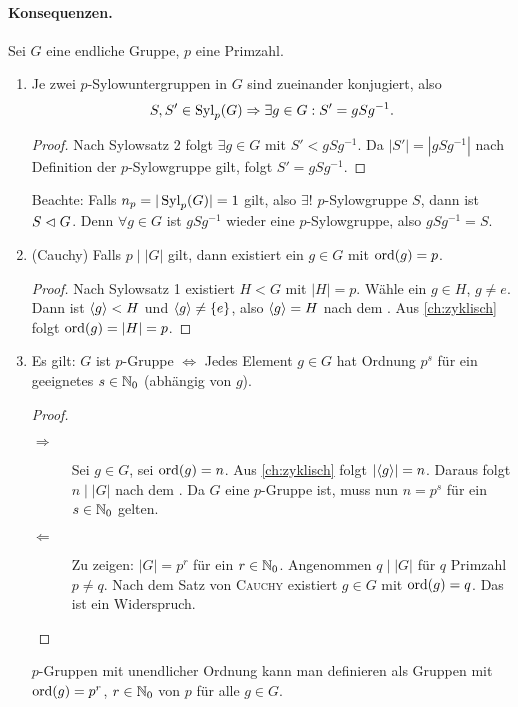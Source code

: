 \documentclass[12pt,a4paper]{scrartcl}
\begin{document}
\paragraph{Konsequenzen.}
Sei $G$ eine endliche Gruppe, $p$ eine Primzahl.
\begin{enumerate}
	\item Je zwei $p$-Sylowuntergruppen in $G$ sind zueinander konjugiert, also \[S, S'\in \operatorname{Syl}_p(G) \Rightarrow \exists g\in G: S' = gSg^{-1}.\] \label{kons:kong}
	\begin{proof}
		Nach Sylowsatz 2 folgt $\exists g\in G$ mit $S'<gSg^{-1}$. Da $|S'| = |gSg^{-1}|$ nach Definition der $p$-Sylowgruppe gilt, folgt $S' = gSg^{-1}$.
	\end{proof}
	
	Beachte: Falls $n_p  = |\operatorname{Syl}_p(G)| = 1$ gilt, also $\exists!$ $p$-Sylowgruppe $S$, dann ist $S\vartriangleleft G$. Denn $\forall g\in G$ ist $gSg^{-1}$ wieder eine $p$-Sylowgruppe, also $gSg^{-1} = S$.
	
	\item (Cauchy) Falls $p\mid|G|$ gilt, dann existiert ein $g\in G$ mit $\operatorname{ord}(g) = p$.
	\begin{proof}
		Nach Sylowsatz 1 existiert $H<G$ mit $|H| = p$. Wähle ein $g\in H$, $g\neq e$. Dann ist $\langle g\rangle <H$ und $\langle g\rangle \neq \{e\}$, also $\langle g\rangle = H$ nach dem . Aus \cref{ch:zyklisch} folgt $\operatorname{ord}(g) = |H| = p$.
	\end{proof}
	\item Es gilt: $G$ ist $p$-Gruppe $\Leftrightarrow $ Jedes Element $g\in G$ hat Ordnung $p^s$ für ein geeignetes $s\in \mathbb N_0$ (abhängig von $g$).
	\begin{proof}~
		\begin{description} %
			\item[\glqq$\Rightarrow$\grqq] Sei $g\in G$, sei $\operatorname{ord}(g) = n$. Aus \cref{ch:zyklisch} folgt $|\langle g\rangle| = n$. Daraus folgt $n\mid |G|$ nach dem . Da $G$ eine $p$-Gruppe ist, muss nun $n = p^s$ für ein $s \in \mathbb N_0$ gelten.
			\item[\grqq $\Leftarrow$\grqq] Zu zeigen: $|G| = p^r$ für ein $r\in\mathbb N_0$.
			Angenommen $q\mid|G|$ für $q$ Primzahl $p\neq q$. Nach dem Satz von \textsc{Cauchy} existiert $g\in G$ mit $\operatorname{ord}(g) = q$. Das ist ein Widerspruch.
    \qedhere
		\end{description}
	\end{proof}
	\begin{bem}
		$p$-Gruppen mit unendlicher Ordnung kann man definieren als Gruppen mit $\operatorname{ord}(g) = p^r$, $r\in \mathbb N_0$ von $p$ für alle $g\in G$.
	\end{bem}
\end{enumerate}
\end{document}
